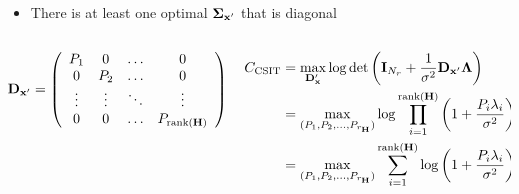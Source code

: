 \documentclass[xcolor=dvipsnames,aspectratio=169]{beamer}
\begin{document}
{\begin{theorem}
 \end{theorem}
 \begin{itemize}
  \item There is at least one optimal $\mathbf{\boldsymbol{\Sigma}}_{\mathbf{x}'}$ that is diagonal
 \end{itemize}
\begin{columns}
 \begin{column}{6cm}
  $$\mathbf{D}_{\mathbf{x}'}=\left(\begin{array}{cccc}
 P_1&0&\dots&0\\
 0&P_2&\dots&0\\
 \vdots&\vdots&\ddots&\vdots\\
 0&0&\dots&P_{\textnormal{rank}(\mathbf{H})}\\
\end{array}\right)$$  
 \end{column}
 \begin{column}{6cm}
 \begin{equation*}
  \begin{split}
    C_{\textnormal{CSIT}}&= \max_{\mathbf{D}_{\mathbf{x}}'}\log\det \left(\mathbf{I}_{N_{r}}+\frac{1}{\sigma^2}\mathbf{D}_{\mathbf{x}'}\mathbf{\boldsymbol{\Lambda}}\right)\\
        &= \max_{(P_1,P_2,\dots,P_{r_{\mathbf{H}}})}\log\prod_{i=1}^{\textnormal{rank}(\mathbf{H})} \left(1+\frac{P_i\lambda_i}{\sigma^2}\right)\\
        &= \max_{(P_1,P_2,\dots,P_{r_{\mathbf{H}}})}\sum_{i=1}^{\textnormal{rank}(\mathbf{H})}\log \left(1+\frac{P_i\lambda_i}{\sigma^2}\right)\\
  \end{split}
 \end{equation*}
 \end{column}
\end{columns}
}
\end{document}
